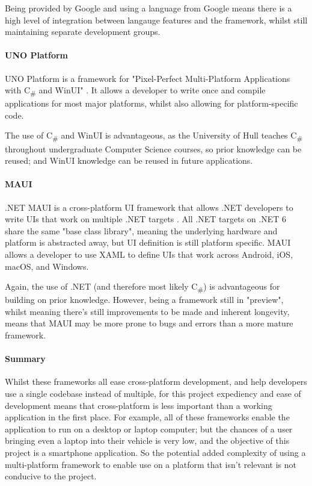 \documentclass[11pt, a4paper, notitlepage]{report}
\begin{document}
Being provided by Google and using a language from Google means there is a high level of integration between langauge features and the framework, whilst still maintaining separate development groups.

\paragraph{UNO Platform}
UNO Platform is a framework for "Pixel-Perfect Multi-Platform Applications with C\textsubscript{\#} and WinUI" \citep{UnoWebsite}. It allows a developer to write once and compile applications for most major platforms, whilst also allowing for platform-specific code. 

The use of C\textsubscript{\#} and WinUI is advantageous, as the University of Hull teaches C\textsubscript{\#} throughout undergraduate Computer Science courses, so prior knowledge can be reused; and WinUI knowledge can be reused in future applications.

\paragraph{MAUI}
.NET MAUI is a cross-platform UI framework that allows .NET developers to write UIs that work on multiple .NET targets \citep{MAUIWebsite}. All .NET targets on .NET 6 share the same "base class library", meaning the underlying hardware and platform is abstracted away, but UI definition is still platform specific. MAUI allows a developer to use XAML to define UIs that work across Android, iOS, macOS, and Windows.

Again, the use of .NET (and therefore most likely C\textsubscript{\#}) is advantageous for building on prior knowledge. However, being a framework still in "preview", whilst meaning there's still improvements to be made and inherent longevity, means that MAUI may be more prone to bugs and errors than a more mature framework.

\paragraph{Summary}
Whilst these frameworks all ease cross-platform development, and help developers use a single codebase instead of multiple, for this project expediency and ease of development means that cross-platform is less important than a working application in the first place. For example, all of these frameworks enable the application to run on a desktop or laptop computer; but the chances of a user bringing even a laptop into their vehicle is very low, and the objective of this project is a smartphone application. So the potential added complexity of using a multi-platform framework to enable use on a platform that isn't relevant is not conducive to the project.
\end{document}
